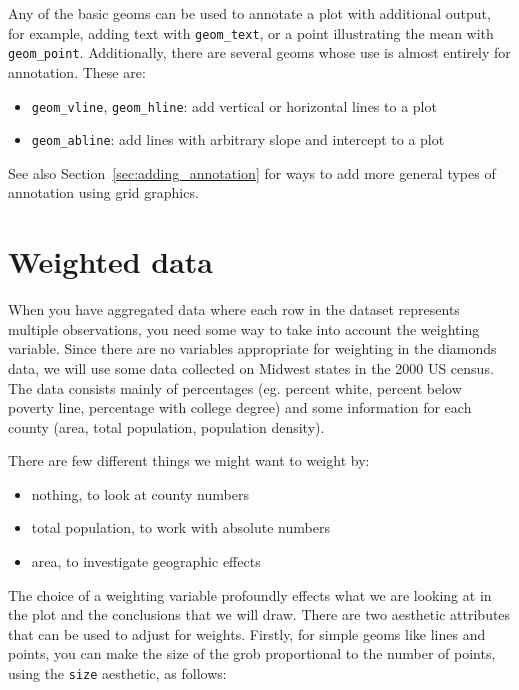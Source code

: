 Any of the basic geoms can be used to annotate a plot with additional output, for example, adding text with {\tt geom\_text}, or a point illustrating the mean with {\tt geom\_point}.  Additionally, there are several geoms whose use is almost entirely for annotation.  These are:

\begin{itemize}
	\item {\tt geom\_vline}, {\tt geom\_hline}: add vertical or horizontal lines to a plot
	\item {\tt geom\_abline}: add lines with arbitrary slope and intercept to a plot
\end{itemize}

See also Section~\ref{sec:adding_annotation} for ways to add more general types of annotation using grid graphics.

\section{Weighted data}\label{sec:weighted_data}

When you have aggregated data where each row in the dataset represents multiple observations, you need some way to take into account the weighting variable.  Since there are no variables appropriate for weighting in the diamonds data, we will use some data collected on Midwest states in the 2000 US census.  The data consists mainly of percentages (eg. percent white, percent below poverty line, percentage with college degree) and some information for each county (area, total population, population density).

There are few different things we might want to weight by: 

\begin{itemize}
	\item nothing, to look at county numbers
	\item total population, to work with absolute numbers
	\item area, to investigate geographic effects
\end{itemize}

\noindent The choice of a weighting variable profoundly effects what we are looking at in the plot and the conclusions that we will draw.  There are two aesthetic attributes that can be used to adjust for weights.  Firstly, for simple geoms like lines and points, you can make the size of the grob proportional to the number of points, using the {\tt size} aesthetic, as follows:

